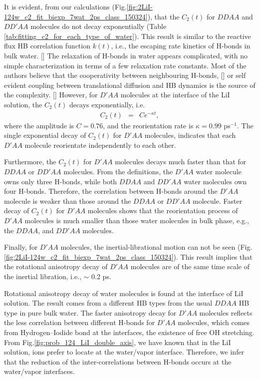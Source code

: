 It is evident, from our calculations (Fig.\space\ref{fig:2LiI-124w_c2_fit_biexp_7wat_2ps_class_150324}), that the $C_2(t)$ for $DDAA$ and $DD'AA$ molecules do not decay exponentially (Table \ref{tab:fitting_c2_for_each_type_of_water}).
This result is similar to the reactive flux HB correlation function $k(t)$, i.e., 
the escaping rate kinetics of H-bonds in bulk water. [\cite{Luzar1996}] 
The relaxation of H-bonds in water appears complicated, with no simple characterization in terms of a few relaxation rate constants. 
Most of the authors believe that the cooperativity between neighbouring H-bonds, [\cite{Sciortino1989, Ohmine1995}] or 
self evident coupling between translational diffusion and HB dynamics is the source of the complexity. [\cite{Luzar1996}] 
However, for $D'AA$ molecules at the interface of the LiI solution,
the $C_2(t)$ decays exponentially, i.e.
\begin{eqnarray}
  C_2(t) &=& C e^{-{\kappa}t},
\label{eq:C_2_D_prime_AA}
\end{eqnarray}
where the amplitude is $C=0.76$, and the reorientation rate is $\kappa = 0.99$ ps$^{-1}$.
The single exponential decay of $C_2(t)$ for $D'AA$ molecules, indicates that each $D'AA$  molecule reorientate independently to each other. 

Furthermore, the $C_2(t)$ for $D'AA$ molecules decays much faster than that for $DDAA$ or $DD'AA$ molecules.
From the definitions, the $D'AA$ water molecule owns only three H-bonds, while both $DDAA$ and $DD'AA$ water molecules own four H-bonds.
Therefore, the correlation between H-bonds around the $D'AA$ molecule is weaker than those around the $DDAA$ or $DD'AA$ molecule. 
Faster decay of $C_2(t)$ for $D'AA$ molecules shows that the reorientation process of $D'AA$
molecules is much smaller than those water molecules in bulk phase, e.g., the $DDAA$, and $DD'AA$ molecules.

Finally, for $D'AA$ molecules, the inertial-librational motion can not be seen (Fig.\space\ref{fig:2LiI-124w_c2_fit_biexp_7wat_2ps_class_150324}). 
This result implies that the rotational anisotropy decay of $D'AA$ molecules
are of the same time scale of the inertial libration, i.e., $\sim$ 0.2 ps.

Rotational anisotropy decay of water molecules is found at the interface of LiI solution. 
The result comes from a different HB types from the usual $DDAA$ HB type in pure bulk water.
The faster anisotropy decay for $D'AA$ molecules reflects the less correlation between different H-bonds for $D'AA$ molecules, which comes from Hydrogen--Iodide bond at the interfaces, the existence of free OH stretching.
From Fig.\space\ref{fig:prob_124_LiI_double_axis}, we have known that in the LiI solution, 
\I ions prefer to locate at the water/vapor interface.  
Therefore, we infer that the reduction of the inter-correlations between H-bonds occurs at the water/vapor interfaces. 

